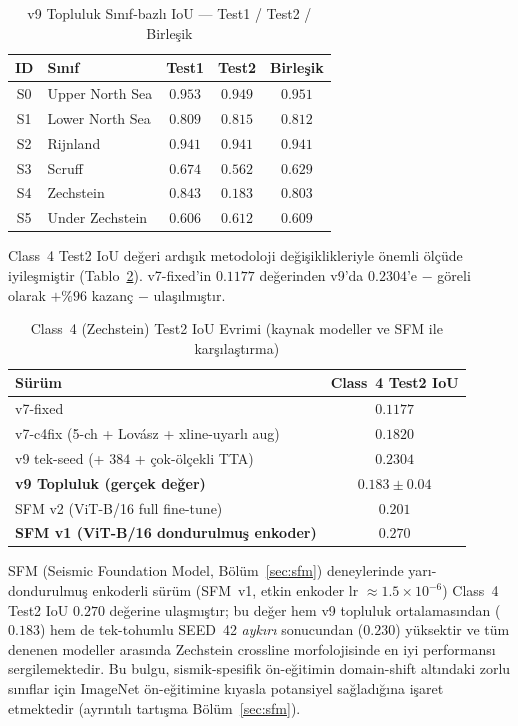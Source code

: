 \documentclass[conference,a4paper,10pt]{IEEEtran}
\begin{document}
\begin{table}[!t]
\renewcommand{\arraystretch}{1.2}
\caption{v9 Topluluk Sınıf-bazlı IoU --- Test1 / Test2 / Birleşik}
\label{tab:perclass}
\centering
\begin{tabular}{clccc}
\toprule
\textbf{ID} & \textbf{Sınıf} & \textbf{Test1} & \textbf{Test2} & \textbf{Birleşik} \\
\midrule
S0 & Upper North Sea & $0.953$ & $0.949$ & $0.951$ \\
S1 & Lower North Sea & $0.809$ & $0.815$ & $0.812$ \\
S2 & Rijnland        & $0.941$ & $0.941$ & $0.941$ \\
S3 & Scruff          & $0.674$ & $0.562$ & $0.629$ \\
S4 & Zechstein       & $0.843$ & $\mathbf{0.183}$ & $0.803$ \\
S5 & Under Zechstein & $0.606$ & $0.612$ & $0.609$ \\
\bottomrule
\end{tabular}
\end{table}

Class~4 Test2 IoU değeri ardışık metodoloji değişiklikleriyle önemli ölçüde
iyileşmiştir (Tablo~\ref{tab:c4_evolusyon}). v7-fixed'in $0.1177$ değerinden
v9'da $0.2304$'e $-$ göreli olarak $+\%96$ kazanç $-$ ulaşılmıştır.

\begin{table}[!t]
\renewcommand{\arraystretch}{1.2}
\caption{Class~4 (Zechstein) Test2 IoU Evrimi (kaynak modeller ve SFM ile karşılaştırma)}
\label{tab:c4_evolusyon}
\centering
\begin{tabular}{lc}
\toprule
\textbf{Sürüm} & \textbf{Class~4 Test2 IoU} \\
\midrule
v7-fixed                     & $0.1177$ \\
v7-c4fix (5-ch + Lov\'asz + xline-uyarlı aug) & $0.1820$ \\
v9 tek-seed (+ $384$ + çok-ölçekli TTA)    & $0.2304$ \\
\textbf{v9 Topluluk (gerçek değer)} & $0.183 \pm 0.04$ \\
\midrule
SFM v2 (ViT-B/16 full fine-tune)       & $0.201$ \\
\rowcolor{green!10}
\textbf{SFM v1 (ViT-B/16 dondurulmuş enkoder)} & $\mathbf{0.270}$ \\
\bottomrule
\end{tabular}
\end{table}

SFM (Seismic Foundation Model, Bölüm~\ref{sec:sfm}) deneylerinde
yarı-dondurulmuş enkoderli sürüm (SFM~v1, etkin enkoder lr $\approx
1.5{\times}10^{-6}$) Class~4 Test2 IoU $0.270$ değerine ulaşmıştır;
bu değer hem v9 topluluk ortalamasından ($0.183$) hem de tek-tohumlu SEED~42
\emph{aykırı} sonucundan ($0.230$) yüksektir ve tüm denenen modeller arasında
Zechstein crossline morfolojisinde en iyi performansı sergilemektedir. Bu
bulgu, sismik-spesifik ön-eğitimin domain-shift altındaki zorlu sınıflar için
ImageNet ön-eğitimine kıyasla potansiyel sağladığına işaret etmektedir
(ayrıntılı tartışma Bölüm~\ref{sec:sfm}).
\end{document}
